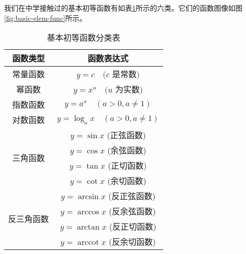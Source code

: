 我们在中学接触过的基本初等函数有如表\ref{tab:基本初等函数分类表}所示的六类。它们的函数图像如图\ref{fig:basic-elem-func}所示。

\begin{table}[h]
\caption{基本初等函数分类表}
\centering
\renewcommand{\arraystretch}{1.5} %
\begin{tabular}{c|c}
\hline
\rowcolor{gray!50}
\textbf{函数类型} & \textbf{函数表达式} \\
\hline
常量函数 & $y=c \quad (c$ 是常数$)$ \\
\hline
幂函数 & $y=x^u \quad (u$ 为实数$)$ \\
\hline
指数函数 & $y=a^x \quad (a>0, a \neq 1)$ \\
\hline
对数函数 & $y=\log_a x \quad (a>0, a \neq 1)$ \\
\hline
\multirow{4}{*}{三角函数} & $y=\sin x$ (正弦函数) \\
 & $y=\cos x$ (余弦函数) \\
 & $y=\tan x$ (正切函数) \\
 & $y=\cot x$ (余切函数) \\
\hline
\multirow{4}{*}{反三角函数} & $y=\arcsin x$ (反正弦函数) \\
 & $y=\arccos x$ (反余弦函数) \\
 & $y=\arctan x$ (反正切函数) \\
 & $y=\operatorname{arccot} x$ (反余切函数) \\
\hline
\end{tabular}
\label{tab:基本初等函数分类表}
\end{table}

